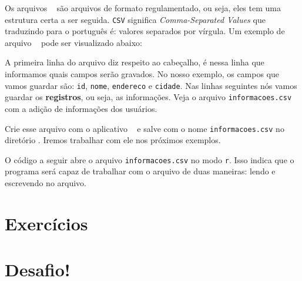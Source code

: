 Os arquivos \csvextensao~ são arquivos de formato regulamentado, ou seja, eles tem
uma estrutura certa a ser seguida. \texttt{CSV} significa \textit{Comma-Separated Values}
que traduzindo para o português é: valores separados por vírgula. Um exemplo de arquivo 
\csvextensao~ pode ser visualizado abaixo:



A primeira linha do arquivo diz respeito ao cabeçalho, é nessa linha que informamos
quais campos serão gravados. No nosso exemplo, os campos que vamos guardar são:
\texttt{id}, \texttt{nome}, \texttt{endereco} e \texttt{cidade}. Nas linhas seguintes
nós vamos guardar os \textbf{registros}, ou seja, as informações. Veja o arquivo
\texttt{informacoes.csv} com a adição de informações dos usuários.



Crie esse arquivo com o aplicativo \sublime~ e salve com o nome \texttt{informacoes.csv}
no diretório . Iremos trabalhar com ele nos próximos
exemplos.

O código a seguir abre o arquivo \texttt{informacoes.csv} no modo \texttt{r}. Isso 
indica que o programa será capaz de trabalhar com o arquivo de duas maneiras: 
lendo e escrevendo no arquivo.

\section{Exercícios}
\label{cap9-exercicios}

\section{Desafio!}
\label{cap9-desafio}
